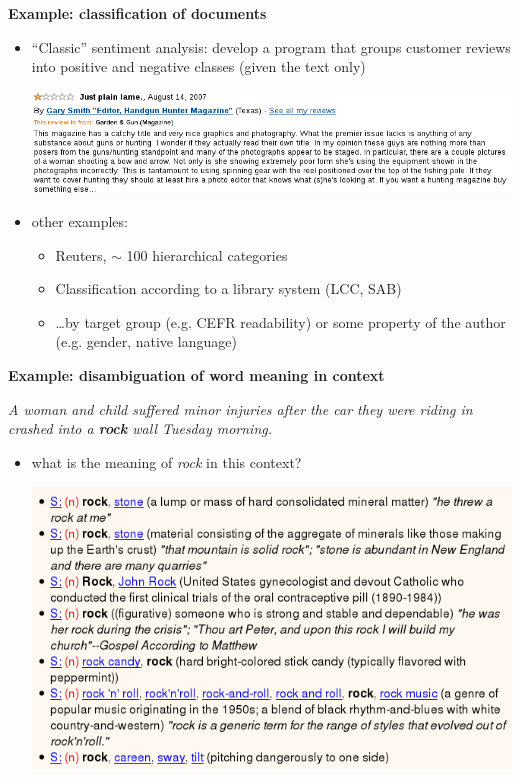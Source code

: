 \documentclass{beamer}
\newcommand{\remph}[1]{\textbf{\color{red} #1}}
\newcommand{\pagestepalt}[2]{
  \begin{frame}[t]
    \begin{minipage}[t][0.26\textheight][t]{\textwidth}
      \begin{center}
        \huge
        \textbf{#1}
      \end{center}
    \end{minipage}
    
    \begin{minipage}[t][0.7\textheight][c]{\textwidth}
      #2
    \end{minipage}
  \end{frame}
}
\begin{document}
\pagestepalt{Example: classification of documents}{

\begin{itemize}
\item ``Classic'' sentiment analysis: develop a program that groups customer reviews into positive
  and negative classes (given the text only)
\begin{center}
\includegraphics[scale=0.4]{images/amazon}
\end{center}

\pause
\item other examples:\pause
  \begin{itemize}
    \item Reuters, $\sim$ 100 hierarchical categories\pause
    \item Classification according to a library system (LCC, SAB)\pause
    \item \ldots by target group (e.g. CEFR readability) or some
      property of the author (e.g. gender, native language)
  \end{itemize}
\end{itemize}

}



\pagestepalt{Example: disambiguation of word meaning in context}{

\emph{A woman and child suffered minor injuries after the car they were riding in crashed into a \remph{rock} wall Tuesday morning.}\pause

\begin{itemize}
\item what is the meaning of \emph{rock} in this context?\pause
  \begin{center}
\begin{center}
\includegraphics[scale=0.35]{images/rock}
\end{center}
  \end{center}
\end{itemize}
}
\end{document}
